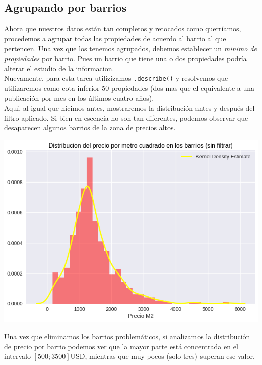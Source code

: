 \documentclass[a4paper, 10pt]{article}
\def\code#1{\texttt{#1}}
\newcommand\tab[1][0.5cm]{\hspace*{#1}}
\begin{document}
			\subsection{Agrupando por barrios}
				Ahora que nuestros datos están tan completos y retocados como querríamos, procedemos a agrupar todas las propiedades
				de acuerdo al barrio al que pertencen. Una vez que los tenemos agrupados, debemos establecer un \emph{minimo de
				propiedades} por barrio. Pues un barrio que tiene una o dos propiedades podría alterar el estudio de la
				informacion. \\
				\tab Nuevamente, para esta tarea utilizizamos \code{.describe()} y resolvemos que utilizaremos como cota inferior
				$50$ propiedades (dos mas que el equivalente a una publicación por mes en los últimos cuatro años). \\
				\tab Aquí, al igual que hicimos antes, mostraremos la distribución antes y después del filtro aplicado. Si bien
				en escencia no son tan diferentes, podemos observar que desaparecen algunos barrios de la zona de precios altos.
				\begin{center}
       				\includegraphics[width=\textwidth]{images/m2HoodUnfilteredKDE}
		   		\end{center}
				\tab Una vez que eliminamos los barrios problemáticos, si analizamos la distribución de precio por barrio
				podemos ver que la mayor parte está concentrada en el intervalo $[500;3500]$USD, mientras que muy pocos
				(solo tres) superan ese valor.
\end{document}
